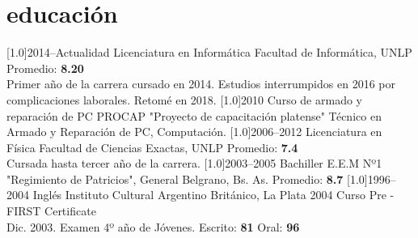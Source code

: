 \documentclass[espanol]{cv-style}     %
\begin{document}
\section{educación}
  \vspace{-0.2cm}
\begin{entrylist}
\entry
{\scalebox{.8}[1.0]{2014--Actualidad}}
{Licenciatura en Informática \small {}}
{Facultad de Informática, UNLP}
{Promedio: \textbf{8.20}\\
{\small Primer año de la carrera cursado en 2014. Estudios interrumpidos en 2016 por complicaciones laborales. Retomé en 2018.
}}%
\entry
{\scalebox{.8}[1.0]{2010}}
{Curso de armado y reparación de PC}
{PROCAP "Proyecto de capacitación platense"}
{\small{Técnico en Armado y Reparación de PC, Computación.
}}
\entry
{\scalebox{.8}[1.0]{2006--2012}}
{Licenciatura en Física \small {}}
{Facultad de Ciencias Exactas, UNLP}
{\small Promedio: \textbf{7.4}\\
{Cursada hasta tercer año de la carrera.
}}
\entry
{\scalebox{.8}[1.0]{2003--2005}}
{Bachiller }
{{E.E.M Nº1 "Regimiento de Patricios", General Belgrano, Bs. As.}}
{\small Promedio: \textbf{8.7}
}
\entry
{\scalebox{.8}[1.0]{1996--2004}}
{Inglés}
{{Instituto Cultural Argentino Británico, La Plata}}
{\small
2004 Curso Pre - FIRST Certificate \\
Dic. 2003. Examen 4º año de Jóvenes. Escrito: \textbf{81} Oral: \textbf{96}
}

\end{entrylist}
\vspace{-0.3cm}
\end{document}
